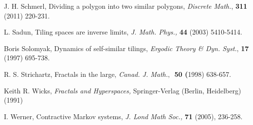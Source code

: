 \documentclass{amsproc}
\theoremstyle{plain}
\theoremstyle{definition}
\numberwithin{equation}{section}
\begin{document}
\begin{thebibliography}{99}
 J. H. Schmerl, Dividing a polygon into two similar polygons, 
\textit{Discrete Math.}, \textbf{311} (2011) 220-231.

 L. Sadun, Tiling spaces are inverse limits, \textit{J. Math.
Phys., }\textbf{44} (2003) 5410-5414.

 Boris Solomyak, Dynamics of self-similar tilings, \textit{%
Ergodic Theory \& Dyn. Syst.}, \textbf{17 }(1997) 695-738.

 R. S. Strichartz, Fractals in the large, \textit{Canad.
J. Math.}$,$\textit{\ }\textbf{50 (}1998) 638-657.

 Keith R. Wicks, \textit{Fractals and Hyperspaces, }%
Springer-Verlag (Berlin, Heidelberg) (1991)

 I. Werner, Contractive Markov systems, \textit{J. Lond Math
Soc., }\textbf{71 }(2005), 236-258.
\end{thebibliography}
\end{document}
